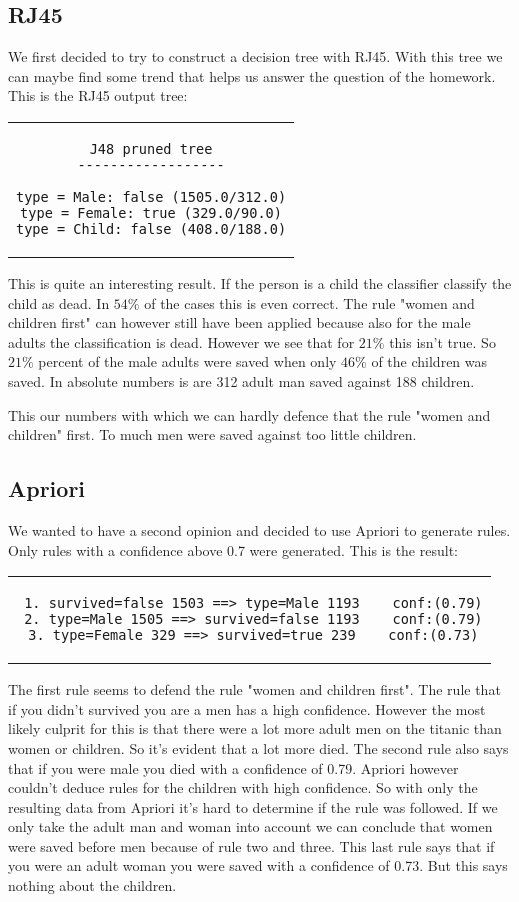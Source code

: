 \documentclass[a4]{article}
\begin{document}
\subsection{RJ45}
We first decided to try to construct a decision tree with RJ45. With this tree we can maybe find some trend that helps us answer the question of the homework. This is the RJ45 output tree:
\begin{center}
\begin{tabular}{c}
\begin{lstlisting}
J48 pruned tree
------------------

type = Male: false (1505.0/312.0)
type = Female: true (329.0/90.0)
type = Child: false (408.0/188.0)
\end{lstlisting}
\end{tabular}
\end{center}
This is quite an interesting result. If the person is a child the classifier classify the child as dead. In $54\%$ of the cases this is even correct. The rule "women and children first" can however still have been applied because also for the male adults the classification is dead. However we see that for $21\%$ this isn't true. So $21\%$ percent of the male adults were saved when only $46\%$ of the children was saved. In absolute numbers is are 312 adult man saved against 188 children.\par
This our numbers with which we can hardly defence that the rule "women and children" first. To much men were saved against too little children.
\subsection{Apriori}
We wanted to have a second opinion and decided to use Apriori to generate rules. Only rules with a confidence above 0.7 were generated. This is the result:
\begin{center}
\begin{tabular}{c}
\begin{lstlisting}
 1. survived=false 1503 ==> type=Male 1193    conf:(0.79)
 2. type=Male 1505 ==> survived=false 1193    conf:(0.79)
 3. type=Female 329 ==> survived=true 239    conf:(0.73)
\end{lstlisting}
\end{tabular}
\end{center}
The first rule seems to defend the rule "women and children first". The rule that if you didn't survived you are a men has a high confidence. However the most likely culprit for this is that there were a lot more adult men on the titanic than women or children. So it's evident that a lot more died. The second rule also says that if you were male you died with a confidence of 0.79. Apriori however couldn't deduce rules for the children with high confidence. So with only the resulting data from Apriori it's hard to determine if the rule was followed. If we only take the adult man and woman into account we can conclude that women were saved before men because of rule two and three. This last rule says that if you were an adult woman you were saved with a confidence of 0.73. But this says nothing about the children.
\end{document}
